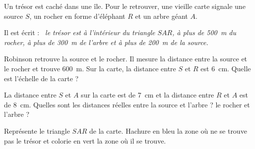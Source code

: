 Un trésor est caché dans une île. Pour le retrouver, une vieille carte signale une source $S$, un rocher en forme d'éléphant $R$ et un arbre géant $A$.
\par Il est écrit : {\em le trésor est à l'intérieur du triangle $SAR$, à plus de 500~m du rocher, à plus de 300~m de l'arbre et à plus de 200~m de la source.}
\begin{myenumerate}
\item Robinson retrouve la source et le rocher. Il mesure la distance entre la source et le rocher et trouve 600~m. Sur la carte, la distance entre $S$ et $R$ est 6~cm. Quelle est l'échelle de la carte ?
\item La distance entre $S$ et $A$ sur la carte est de 7~cm et la distance entre $R$ et $A$ est de 8~cm. Quelles sont les distances réelles entre la source et l'arbre ? le rocher et l'arbre ?
\item Représente le triangle $SAR$ de la carte. Hachure en bleu la zone où ne se trouve pas le trésor et colorie en vert la zone où il se trouve.  
\end{myenumerate}

